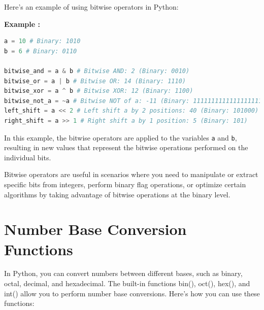 \documentclass[12pt]{book}
\newtheorem{Example}{Example}[chapter]
\renewenvironment{Example}{\begin{trivlist}\item\relax
\textbf{Example \thesection: }}{\end{trivlist}}
\begin{document}
Here's an example of using bitwise operators in Python:

\begin{Example}
\begin{lstlisting}[language=Python]
a = 10 # Binary: 1010
b = 6 # Binary: 0110

bitwise_and = a & b # Bitwise AND: 2 (Binary: 0010)
bitwise_or = a | b # Bitwise OR: 14 (Binary: 1110)
bitwise_xor = a ^ b # Bitwise XOR: 12 (Binary: 1100)
bitwise_not_a = ~a # Bitwise NOT of a: -11 (Binary: 11111111111111111111111111110101)
left_shift = a << 2 # Left shift a by 2 positions: 40 (Binary: 101000)
right_shift = a >> 1 # Right shift a by 1 position: 5 (Binary: 101)
\end{lstlisting}
\end{Example}

In this example, the bitwise operators are applied to the variables \texttt{a} and \texttt{b}, resulting in new values that represent the bitwise operations performed on the individual bits.

Bitwise operators are useful in scenarios where you need to manipulate or extract specific bits from integers, perform binary flag operations, or optimize certain algorithms by taking advantage of bitwise operations at the binary level.

\section{Number Base Conversion Functions}

In Python, you can convert numbers between different bases, such as binary, octal, decimal, and hexadecimal. The built-in functions bin(), oct(), hex(), and int() allow you to perform number base conversions. Here's how you can use these functions:
\end{document}
